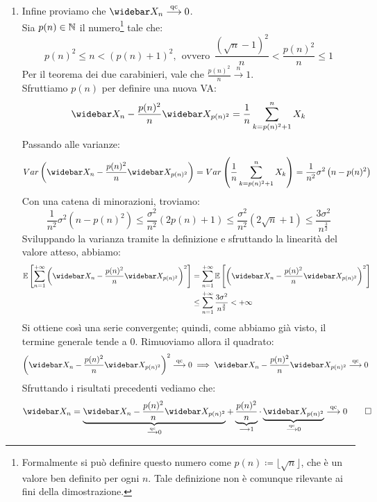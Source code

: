 \begin{dimo}
\begin{enumerate}
    \item Infine proviamo che $\widebar X_n \stackrel{\text{qc}}{\longrightarrow} 0$.\\
      Sia $p(n) \in \mathbb N$ il numero\footnote{Formalmente si può definire questo numero come $p(n) \coloneqq \lfloor{\sqrt n}\rfloor$, che è un valore ben definito per ogni $n$. Tale definizione non è comunque rilevante ai fini della dimostrazione.} tale che:
      $$p(n)^2 \le n < (p(n)+1)^2, \ \ \text{ovvero} \ \ \frac{(\sqrt{n}-1)^2}{n} < \frac{p(n)^2}{n} \le 1$$
      Per il teorema dei due carabinieri, vale che $\frac{p(n)^2}{n} \stackrel{n}{\longrightarrow}1$. \\
      Sfruttiamo $p(n)$ per definire una nuova VA:
      $$\widebar X_n - \dfrac{p(n)^2}{n} \widebar X_{p(n)^2} = \dfrac{1}{n} \sum_{k= p(n)^2+1}^{n} X_k$$
      Passando alle varianze:
      $$ Var \left( \widebar X_n - \dfrac{p(n)^2}{n} \widebar X_{p(n)^2} \right)
      = Var \left( \dfrac{1}{n} \sum_{k= p(n)^2+1}^{n} X_k \right)
      = \dfrac{1}{n^2} \sigma^2 \left(n-p(n)^2 \right)$$
      Con una catena di minorazioni, troviamo:
      $$\dfrac{1}{n^2} \sigma^2 \left(n-p(n)^2 \right)
      \le \dfrac{\sigma^2}{n^2} (2p(n)+1)
      \le \dfrac{\sigma^2}{n^2} \left(2 \sqrt{n}+1 \right)
      \le \dfrac{3 \sigma^2}{n^{\frac{3}{2}}}$$
      Sviluppando la varianza tramite la definizione e sfruttando la linearità del valore atteso, abbiamo:
      \begin{align*}
        \EE \left[ \sum_{n=1}^{+\infty} \left( \widebar X_n - \dfrac{p(n)^2}{n} \widebar X_{p(n)^2} \right)^2 \right]
        &= \sum_{n=1}^{+\infty} \EE \left[ \left(\widebar X_n - \dfrac{p(n)^2}{n} \widebar X_{p(n)^2} \right)^2 \right]\\
        &\le \sum_{n=1}^{+\infty} \dfrac{3 \sigma^2}{n^ {\frac{3}{2}} } < +\infty
      \end{align*}
      Si ottiene così una serie convergente; quindi, come abbiamo già visto, il termine generale tende a $0$. Rimuoviamo allora il quadrato:
      $$ \left( \widebar X_n - \dfrac{p(n)^2}{n} \widebar X_{p(n)^2} \right)^2 \stackrel{\text{qc}}{\longrightarrow} 0
      \implies \widebar X_n - \dfrac{p(n)^2}{n} \widebar X_{p(n)^2}  \stackrel{\text{qc}}{\longrightarrow} 0 \ $$
      Sfruttando i risultati precedenti vediamo che:
      $$\widebar X_n =
      \underbrace{ \widebar X_n - \dfrac{p(n)^2}{n} \widebar X_{p(n)^2} }_{\stackrel{\text{qc}}{\longrightarrow} 0} +
      \underbrace{ \dfrac{p(n)^2}{n}}_{\longrightarrow 1} \cdot
      \underbrace{ \widebar X_{p(n)^2} }_{\stackrel{\text{qc}}{\longrightarrow} 0}  \stackrel{\text{qc}}{\longrightarrow} 0 \qedhere$$
  \end{enumerate}
\end{dimo}

